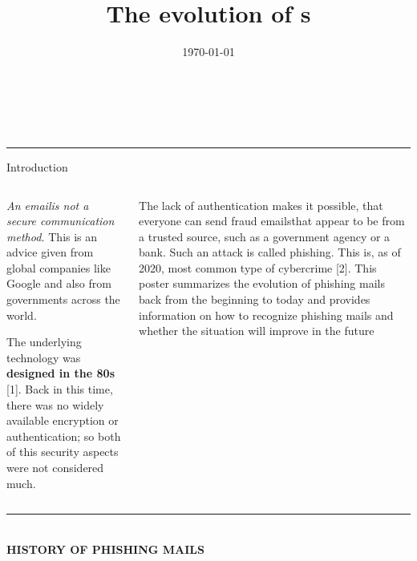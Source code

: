 \documentclass[compress,dvipsnames]{beamer}
\title{The evolution of \Phm s}
\author{}
\date{\today}
\newcommand{\mainRuleThickness}{4pt}
\newcommand{\blockTitleSize}{\huge}
\newcommand{\Em}{email} %
\newcommand{\Ems}{emails}
\newcommand{\ph}{phishing}
\newcommand{\phm}{phishing mail}
\begin{document}
\beamertemplatenavigationsymbolsempty

\phantom{X}
\begin{block}
    {\phantom{X}\\\centering \textbf{\Huge\inserttitle}\\\phantom{X}}
\end{block}

\rule[0cm]{\textwidth}{\mainRuleThickness}

\begin{block}{\centering \blockTitleSize Introduction}
    \begin{columns}[T]
        \begin{column}{0.485\textwidth}
            \begin{minipage}[t][0.075\textheight][t]{\textwidth}
                \large
                \emph{An \Em\space is not a secure communication method.} This is an advice given from global companies like Google and also from governments across the world.

                The underlying technology was \textbf{designed in the 80s} [1]. Back in this time, there was no widely available encryption or authentication; so both of this security aspects were not considered much.
            \end{minipage}
        \end{column}

        \begin{column}{0.485\textwidth}
            \begin{minipage}[t][0.075\textheight][t]{\textwidth}
                \large
                The lack of authentication makes it possible, that everyone can send fraud \Ems\space that appear to be from a trusted source, such as a government agency or a bank. Such an attack is called \ph. This is, as of 2020, most common type of cybercrime [2]. This poster summarizes the evolution of \phm s back from the beginning to today and provides information on how to recognize \phm s and whether the situation will improve in the future
            \end{minipage}
        \end{column}
    \end{columns}
\end{block}

\vspace{-1.5cm}
\rule[0cm]{\textwidth}{\mainRuleThickness}
\phantom{X}\\
{\large \textbf{HISTORY OF PHISHING MAILS}}
\end{document}
